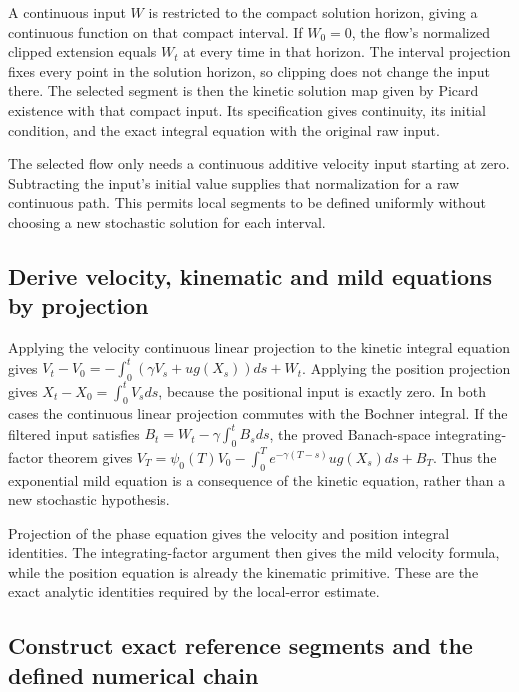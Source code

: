 \documentclass[11pt,a4paper]{report}
\begin{document}
A continuous input \(W\) is restricted to the compact solution horizon, giving a continuous function on that compact interval. If \(W_0=0\), the flow's normalized clipped extension equals \(W_t\) at every time in that horizon. The interval projection fixes every point in the solution horizon, so clipping does not change the input there. The selected segment is then the kinetic solution map given by Picard existence with that compact input. Its specification gives continuity, its initial condition, and the exact integral equation with the original raw input.



The selected flow only needs a continuous additive velocity input starting at zero. Subtracting the input’s initial value supplies that normalization for a raw continuous path. This permits local segments to be defined uniformly without choosing a new stochastic solution for each interval.

\subsection{\texorpdfstring{Derive velocity, kinematic and mild equations by projection}{Derive velocity, kinematic and mild equations by projection}}
\label{report-step-KineticLangevin-CoupledSegments-lean-3}


Applying the velocity continuous linear projection to the kinetic integral equation gives \(V_t-V_0=-\int_0^t(\gamma V_s+u g(X_s))ds+W_t\). Applying the position projection gives \(X_t-X_0=\int_0^tV_sds\), because the positional input is exactly zero. In both cases the continuous linear projection commutes with the Bochner integral. If the filtered input satisfies \(B_t=W_t-\gamma\int_0^tB_sds\), the proved Banach-space integrating-factor theorem gives \(V_T=\psi_0(T)V_0-\int_0^Te^{-\gamma(T-s)}u g(X_s)ds+B_T\). Thus the exponential mild equation is a consequence of the kinetic equation, rather than a new stochastic hypothesis.



Projection of the phase equation gives the velocity and position integral identities. The integrating-factor argument then gives the mild velocity formula, while the position equation is already the kinematic primitive. These are the exact analytic identities required by the local-error estimate.

\subsection{\texorpdfstring{Construct exact reference segments and the defined numerical chain}{Construct exact reference segments and the defined numerical chain}}
\label{report-step-KineticLangevin-CoupledSegments-lean-4}
\end{document}
